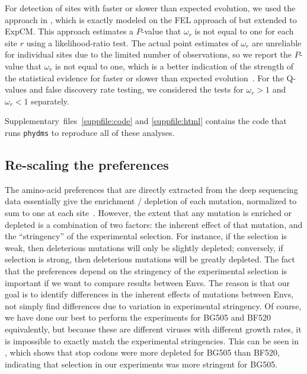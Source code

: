 \documentclass[9pt]{elife}
\begin{document}
For detection of sites with faster or slower than expected evolution, we used the approach in \citet{bloom2017identification}, which is exactly modeled on the FEL approach of \citet{kosakovsky2005not} but extended to ExpCM.
This approach estimates a $P$-value that $\omega_r$ is not equal to one for each site $r$ using a likelihood-ratio test.
The actual point estimates of $\omega_r$ are unreliable for individual sites due to the limited number of observations, so we report the $P$-value that $\omega_r$ is not equal to one, which is a better indication of the strength of the statistical evidence for faster or slower than expected evolution~\citep{kosakovsky2005not,murrell2012detecting}.
For the Q-values and false discovery rate testing, we considered the tests for $\omega_r > 1$ and $\omega_r < 1$ separately.

Supplementary~files~\ref{suppfile:code} and \ref{suppfile:html} contains the code that runs \texttt{phydms} to reproduce all of these analyses.

\subsection{Re-scaling the preferences}
The amino-acid preferences that are directly extracted from the deep sequencing data essentially give the enrichment / depletion of each mutation, normalized to sum to one at each site~\cite[][\url{https://jbloomlab.github.io/dms_tools2/prefs.html}]{bloom2015software}.
However, the extent that any mutation is enriched or depleted is a combination of two factors: the inherent effect of that mutation, and the ``stringency'' of the experimental selection.
For instance, if the selection is weak, then deleterious mutations will only be slightly depleted; conversely, if selection is strong, then deleterious mutations will be greatly depleted.
The fact that the preferences depend on the stringency of the experimental selection is important if we want to compare results between Envs.
The reason is that our goal is to identify differences in the inherent effects of mutations between Envs, not simply find differences due to variation in experimental stringency.
Of course, we have done our best to perform the experiments for BG505 and BF520 equivalently, but because these are different viruses with different growth rates, it is impossible to exactly match the experimental stringencies.
This can be seen in , which shows that stop codons were more depleted for BG505 than BF520, indicating that selection in our experiments was more stringent for BG505.
\end{document}
